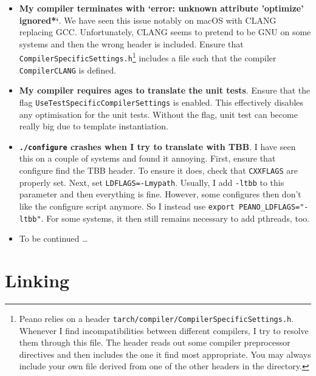\begin{itemize}
  \item \textbf{ My compiler terminates with `error: unknown
   attribute 'optimize' ignored*`}. We have seen this issue notably on macOS
   with CLANG replacing GCC. Unfortunately, CLANG seems to pretend to be GNU on
   some systems and then the wrong header is included. Ensure that
   \texttt{CompilerSpecificSettings.h}\footnote{Peano relies on a header \texttt{tarch/compiler/CompilerSpecificSettings.h}.
Whenever I find incompatibilities between different compilers, I try to resolve them through this file. 
The header reads out some compiler preprocessor directives and then includes the
one it find most appropriate. 
You may always include your own file derived from one of the other headers in
the directory.} includes a file such that the
   compiler
   \linebreak
   \texttt{CompilerCLANG} is defined.
  \item \textbf{ My compiler requires ages to translate the unit tests}. Ensure
  that the flag \linebreak \texttt{UseTestSpecificCompilerSettings} is enabled.
  This effectively disables any optimisation for the unit tests. Without the
  flag, unit test can become really big due to template instantiation.
  \item \textbf{\texttt{./configure} crashes when I try to translate with TBB}.
  I have seen this on a couple of systems and found it annoying. 
  First, ensure that configure
  find the TBB header. To ensure it does, check that \texttt{CXXFLAGS} are properly
  set. Next, set \texttt{LDFLAGS=-Lmypath}. Usually, I add \texttt{-ltbb} to 
  this parameter and then everything is fine. However, some configures then don't 
  like the configure script anymore. So I instead use \texttt{export PEANO\_LDFLAGS="-ltbb"}. 
  For some systems, it then still remains necessary to add pthreads, too.
  \item To be continued \dots
\end{itemize}



\section{Linking}

